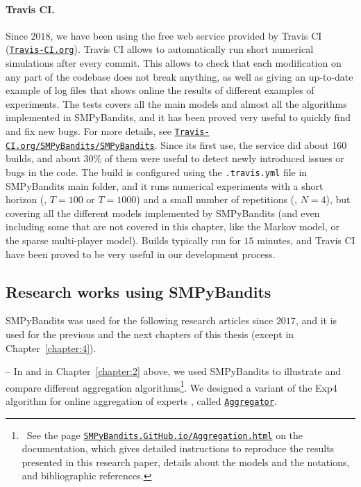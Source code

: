 \paragraph{Travis CI.}
Since $2018$, we have been using the free web service provided by Travis CI (\href{https://travis-ci.org/}{\texttt{Travis-CI.org}}).
Travis CI allows to automatically run short numerical simulations after every commit.
This allows to check that each modification on any part of the codebase does not break anything, as well as giving an up-to-date example of log files that shows online the results of different examples of experiments. The tests covers all the main models and almost all the algorithms implemented in SMPyBandits, and it has been proved very useful to quickly find and fix new bugs.
For more details, see \href{https://travis-ci.org/SMPyBandits/SMPyBandits}{\texttt{Travis-CI.org/SMPyBandits/SMPyBandits}}.
%
Since its first use, the service did about 160 builds, and about $30\%$ of them were useful to detect newly introduced issues or bugs in the code.
The build is configured using the \texttt{.travis.yml} file in SMPyBandits main folder, and it runs numerical experiments with a short horizon (\eg, $T=100$ or $T=1000$) and a small number of repetitions (\ie, $N=4$), but covering all the different models implemented by SMPyBandits (and even including some that are not covered in this chapter, like the Markov model, or the sparse multi-player model).
Builds typically run for $15$ minutes, and Travis CI have been proved to be very useful in our development process.



\subsection{Research works using SMPyBandits}

SMPyBandits was used for the following research articles since $2017$, and it is used for the previous and the next chapters of this thesis (except in Chapter~\ref{chapter:4}).

-- In \cite{Besson2018WCNC} and in Chapter~\ref{chapter:2} above, we used SMPyBandits to illustrate and compare different aggregation algorithms\footnote{~See the page \texttt{\href{https://SMPyBandits.GitHub.io/Aggregation.html}{SMPyBandits.GitHub.io/Aggregation.html}} on the documentation, which gives detailed instructions to reproduce the results presented in this research paper, details about the models and the notations, and bibliographic references.}. We designed a variant of the Exp4 algorithm for online aggregation of experts \cite{Bubeck12}, called \texttt{\href{https://SMPyBandits.GitHub.io/docs/Policies.Aggregator.html}{Aggregator}}.

